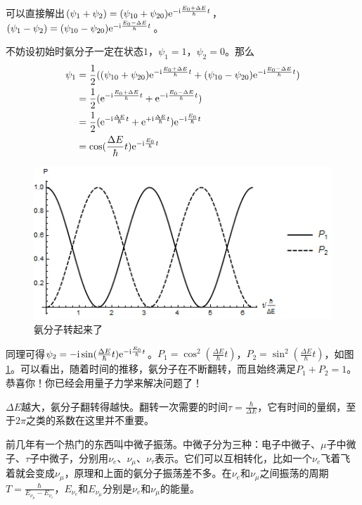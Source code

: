 可以直接解出$(\psi_1+\psi_2)=(\psi_{1 0}+\psi_{2 0}) \mathrm{e}^{-\mathrm{i} \frac{E_0+\Delta E}{\hbar} t}$，$(\psi_1-\psi_2)=(\psi_{1 0}-\psi_{2 0}) \mathrm{e}^{-\mathrm{i} \frac{E_0-\Delta E}{\hbar} t}$。

不妨设初始时氨分子一定在状态$1$，$\psi_1=1$，$\psi_2=0$。那么
\begin{align*}
\psi_1&=\frac{1}{2}((\psi_{1 0}+\psi_{2 0}) \mathrm{e}^{-\mathrm{i} \frac{E_0+\Delta E}{\hbar} t}+(\psi_{1 0}-\psi_{2 0}) \mathrm{e}^{-\mathrm{i} \frac{E_0-\Delta E}{\hbar} t}) \\
&=\frac{1}{2}(\mathrm{e}^{-\mathrm{i} \frac{E_0+\Delta E}{\hbar} t}+\mathrm{e}^{-\mathrm{i} \frac{E_0-\Delta E}{\hbar} t}) \\
&=\frac{1}{2}(\mathrm{e}^{-\mathrm{i} \frac{\Delta E}{\hbar} t}+\mathrm{e}^{+\mathrm{i} \frac{\Delta E}{\hbar} t}) \mathrm{e}^{-\mathrm{i} \frac{E_0}{\hbar} t} \\
&=\cos (\frac{\Delta E}{\hbar} t) \mathrm{e}^{-\mathrm{i} \frac{E_0}{\hbar} t}
\end{align*}
\begin{figure}[htb]
\centering
\includegraphics[scale=0.5]{fig/ammonia-osc}
\caption{氨分子转起来了}
\label{fig-ammonia-osc}
\end{figure}

同理可得$\psi_2=-\mathrm{i} \sin (\frac{\Delta E}{\hbar} t) \mathrm{e}^{-\mathrm{i} \frac{E_0}{\hbar} t}$。$P_1=\cos^2 (\frac{\Delta E}{\hbar} t)$，$P_2=\sin^2 (\frac{\Delta E}{\hbar} t)$，如图\ref{fig-ammonia-osc}。可以看出，随着时间的推移，氨分子在不断翻转，而且始终满足$P_1+P_2=1$。恭喜你！你已经会用量子力学来解决问题了！

$\Delta E$越大，氨分子翻转得越快。翻转一次需要的时间$\tau=\frac{\hbar}{\Delta E}$，它有时间的量纲，至于$2 \pi$之类的系数在这里并不重要。

前几年有一个热门的东西叫中微子振荡。中微子分为三种：电子中微子、$\mu$子中微子、$\tau$子中微子，分别用$\nu_e$、$\nu_\mu$、$\nu_\tau$表示。它们可以互相转化，比如一个$\nu_e$飞着飞着就会变成$\nu_\mu$，原理和上面的氨分子振荡差不多。在$\nu_e$和$\nu_\mu$之间振荡的周期$T=\frac{\hbar}{E_{\nu_\mu}-E_{\nu_e}}$，$E_{\nu_e}$和$E_{\nu_\mu}$分别是$\nu_e$和$\nu_\mu$的能量。

